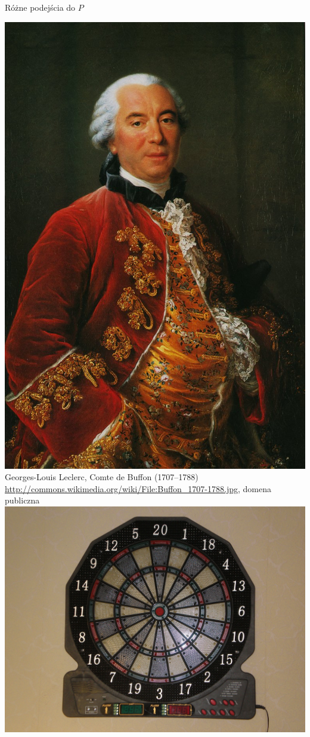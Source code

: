 \documentclass{mp}
\begin{document}
\begin{frame}{Różne podejścia do $P$}
\begin{center}
{}
{
	\includegraphics[height=.7\textheight]{Buffon_1707-1788.jpg}\\
	Georges-Louis Leclerc, Comte de Buffon (1707--1788)\\
	{\tiny \url{http://commons.wikimedia.org/wiki/File:Buffon_1707-1788.jpg}, domena publiczna}
}
{
	\includegraphics[height=.7\textheight]{Electronic_dart_board.jpg}\\
}
\end{center}
\end{frame}
\end{document}
